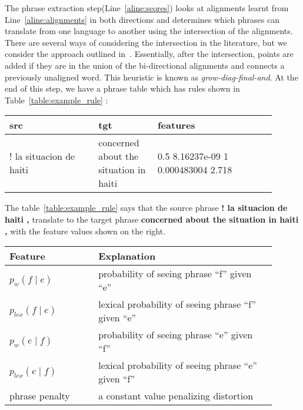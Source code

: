 The phrase extraction step(Line~\ref{aline:scores}) looks at alignments learnt from Line~\ref{aline:alignments} in both directions and determines which phrases can translate from one language to another using the intersection of the alignments. There are several ways of considering the intersection in the literature, but we consider the approach outlined in~\cite{Koehn:03}. Essentially, after the intersection, points are added if they are in the union of the bi-directional alignments and connects a previously unaligned word. This heuristic is known as \emph{grow-diag-final-and}. At the end of this step, we have a phrase table which has rules shown in Table~\ref{table:example_rule} : 

\begin{table*}[ht]
\small
\small
\centering
\begin{tabular}{p{0.3\linewidth}p{0.2\linewidth}p{0.4\linewidth}}
\toprule
src & tgt & features \\
\toprule
! la situacion de haiti & concerned about the situation in haiti & 0.5 8.16237e-09 1 0.000483004 2.718 \\
\bottomrule
\end{tabular}
\caption{Example of a phrase pair in the Haitian Kreyol to English table}
\label{table:example_rule}
\end{table*}

The table~\ref{table:example_rule}  says that the source phrase \textbf{! la situacion de haiti ,} translate to the target phrase \textbf{concerned about the situation in haiti ,} with the feature values shown on the right. 

\begin{table*}
	\small
	\small
	\begin{tabular}{p{0.3\linewidth}p{0.6\linewidth}}
	\toprule
	Feature &  Explanation \\
	\toprule
	$p_{w}(f \mid e)$ & probability of seeing phrase ``f'' given ``e'' \\
	$p_{lex}(f \mid e)$ & lexical probability of seeing phrase ``f'' given ``e'' \\
	$p_{w}(e \mid f)$ & probability of seeing phrase ``e'' given ``f'' \\
	$p_{lex}(e \mid f)$ & lexical probability of seeing phrase ``e'' given ``f'' \\
   	phrase penalty & a constant value penalizing distortion \\
	\bottomrule
	\end{tabular}
	\caption{Features of the phrase pairs, where ``f'' is foreign/source \& ``e'' is target/english}
	\label{table:features}
\end{table*}

